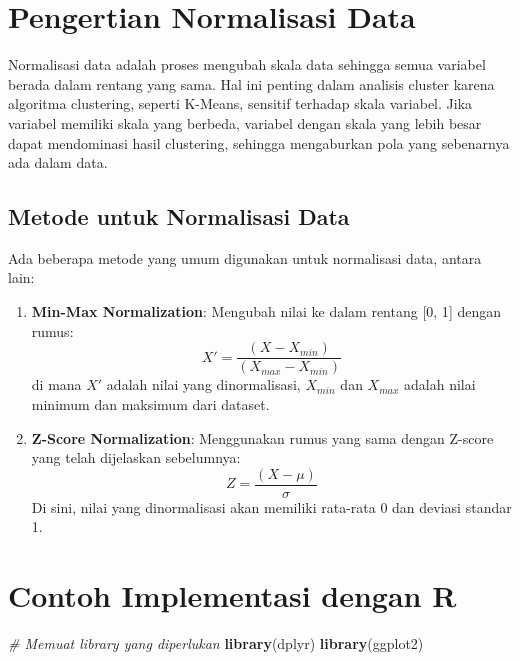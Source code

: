 \documentclass[
  oneside]{book}
\newenvironment{Shaded}{\begin{snugshade}}{\end{snugshade}}
\newcommand{\CommentTok}[1]{\textcolor[rgb]{0.56,0.35,0.01}{\textit{#1}}}
\newcommand{\FunctionTok}[1]{\textcolor[rgb]{0.13,0.29,0.53}{\textbf{#1}}}
\newcommand{\NormalTok}[1]{#1}
\begin{document}
\section{Pengertian Normalisasi Data}\label{pengertian-normalisasi-data}

Normalisasi data adalah proses mengubah skala data sehingga semua variabel berada dalam rentang yang sama. Hal ini penting dalam analisis cluster karena algoritma clustering, seperti K-Means, sensitif terhadap skala variabel. Jika variabel memiliki skala yang berbeda, variabel dengan skala yang lebih besar dapat mendominasi hasil clustering, sehingga mengaburkan pola yang sebenarnya ada dalam data.

\subsection{Metode untuk Normalisasi Data}\label{metode-untuk-normalisasi-data}

Ada beberapa metode yang umum digunakan untuk normalisasi data, antara lain:

\begin{enumerate}
\def\labelenumi{\arabic{enumi}.}
\item
  \textbf{Min-Max Normalization}: Mengubah nilai ke dalam rentang {[}0, 1{]} dengan rumus:
  \[
  X' = \frac{(X - X_{min})}{(X_{max} - X_{min})}
  \]
  di mana \(X'\) adalah nilai yang dinormalisasi, \(X_{min}\) dan \(X_{max}\) adalah nilai minimum dan maksimum dari dataset.
\item
  \textbf{Z-Score Normalization}: Menggunakan rumus yang sama dengan Z-score yang telah dijelaskan sebelumnya:
  \[
  Z = \frac{(X - \mu)}{\sigma}
  \]
  Di sini, nilai yang dinormalisasi akan memiliki rata-rata 0 dan deviasi standar 1.
\end{enumerate}

\section{Contoh Implementasi dengan R}\label{contoh-implementasi-dengan-r}

\begin{Shaded}
\begin{Highlighting}[]
\CommentTok{\# Memuat library yang diperlukan}
\FunctionTok{library}\NormalTok{(dplyr)}
\FunctionTok{library}\NormalTok{(ggplot2)}
\end{Highlighting}
\end{Shaded}
\end{document}
